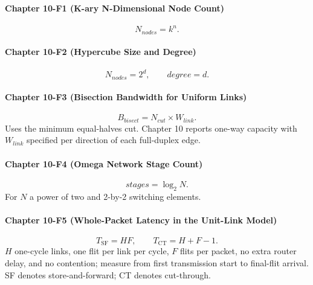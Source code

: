 \paragraph{Chapter 10-F1 (K-ary N-Dimensional Node Count)}\label{par:ch10-formula-1}
\begin{equation}\label{eq:app-ch10-formula-kary}
    N_{nodes}=k^n.
\end{equation}

\paragraph{Chapter 10-F2 (Hypercube Size and Degree)}\label{par:ch10-formula-2}
\begin{equation}\label{eq:app-ch10-formula-hypercube}
    N_{nodes}=2^d,\qquad degree=d.
\end{equation}

\paragraph{Chapter 10-F3 (Bisection Bandwidth for Uniform Links)}\label{par:ch10-formula-3}
\begin{equation}\label{eq:app-ch10-formula-bisection}
    B_{bisect}=N_{cut}\times W_{link}.
\end{equation}
Uses the minimum equal-halves cut. Chapter 10 reports one-way capacity with $W_{link}$ specified per direction of each full-duplex edge.

\paragraph{Chapter 10-F4 (Omega Network Stage Count)}\label{par:ch10-formula-4}
\begin{equation}\label{eq:app-ch10-formula-omega}
    stages=\log_2 N.
\end{equation}
For $N$ a power of two and 2-by-2 switching elements.

\paragraph{Chapter 10-F5 (Whole-Packet Latency in the Unit-Link Model)}\label{par:ch10-formula-5}
\begin{equation}\label{eq:app-network-packet-latency}
    T_{\mathrm{SF}}=HF,\qquad T_{\mathrm{CT}}=H+F-1.
\end{equation}
$H$ one-cycle links, one flit per link per cycle, $F$ flits per packet, no extra router delay, and no contention; measure from first transmission start to final-flit arrival.
SF denotes store-and-forward; CT denotes cut-through.
\par
\endgroup

